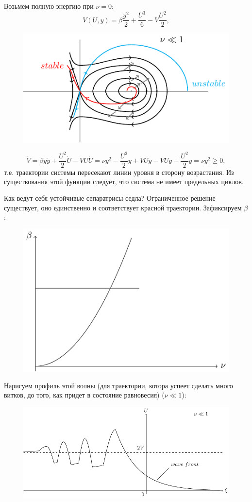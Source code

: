 Возьмем полную энергию при $\nu=0$:
\begin{equation*}
	V(U,y)=\beta\frac{y^2}{2}+\frac{U^3}{6}-V\frac{U^2}{2},
\end{equation*}

\begin{figure}[H]
	\centering
	\includegraphics[width=0.4\linewidth]{fig/fig30.pdf}   
\end{figure}

\begin{equation*}
	\dot{V}=\beta y \dot{y}+\frac{U^2}{2}\dot{U}-VU\dot{U}=\nu y^2-\frac{U^2}{2}y+VUy-VUy+\frac{U^2}{2}y=\nu y^2\geqslant 0,
\end{equation*}
т.е. траектории системы пересекают линии уровня в сторону возрастания. Из существования этой функции следует, что система не имеет предельных циклов. 

Как ведут себя устойчивые сепаратрисы седла? Ограниченное решение существует, оно единственно и соответствует красной траектории. Зафиксируем $\beta$:
\begin{figure}[H]
	\centering
	\includegraphics[width=0.4\linewidth]{fig/fig28.pdf}   
\end{figure}

Нарисуем профиль этой волны (для траектории, котора успеет сделать много витков, до того, как придет в состояние равновесия) ($\nu\ll1$):
\begin{figure}[H]
	\centering
	\includegraphics[width=0.6\linewidth]{fig/fig29.pdf}   
\end{figure}

